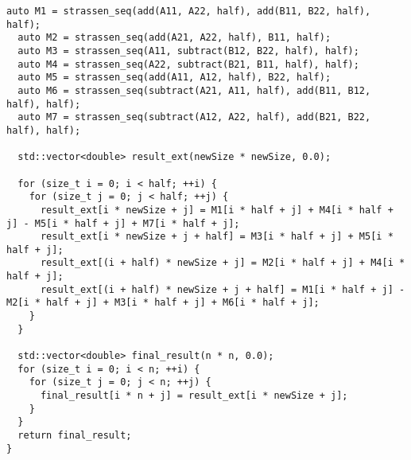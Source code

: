 \documentclass[a4paper,12pt]{article}
\begin{document}
\begin{lstlisting}[caption={Функция strassen\_seq}]
  auto M1 = strassen_seq(add(A11, A22, half), add(B11, B22, half), half);
  auto M2 = strassen_seq(add(A21, A22, half), B11, half);
  auto M3 = strassen_seq(A11, subtract(B12, B22, half), half);
  auto M4 = strassen_seq(A22, subtract(B21, B11, half), half);
  auto M5 = strassen_seq(add(A11, A12, half), B22, half);
  auto M6 = strassen_seq(subtract(A21, A11, half), add(B11, B12, half), half);
  auto M7 = strassen_seq(subtract(A12, A22, half), add(B21, B22, half), half);

  std::vector<double> result_ext(newSize * newSize, 0.0);

  for (size_t i = 0; i < half; ++i) {
    for (size_t j = 0; j < half; ++j) {
      result_ext[i * newSize + j] = M1[i * half + j] + M4[i * half + j] - M5[i * half + j] + M7[i * half + j];
      result_ext[i * newSize + j + half] = M3[i * half + j] + M5[i * half + j];
      result_ext[(i + half) * newSize + j] = M2[i * half + j] + M4[i * half + j];
      result_ext[(i + half) * newSize + j + half] = M1[i * half + j] - M2[i * half + j] + M3[i * half + j] + M6[i * half + j];
    }
  }

  std::vector<double> final_result(n * n, 0.0);
  for (size_t i = 0; i < n; ++i) {
    for (size_t j = 0; j < n; ++j) {
      final_result[i * n + j] = result_ext[i * newSize + j];
    }
  }
  return final_result;
}
\end{lstlisting}
\end{document}
